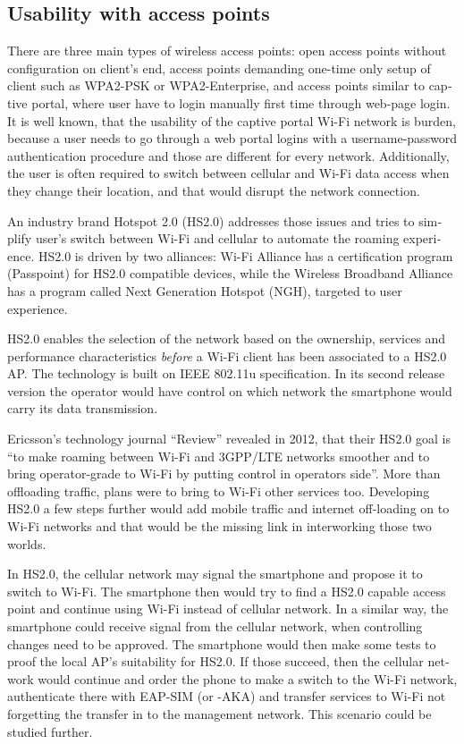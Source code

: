 \documentclass[12pt,a4paper,english]{tutthesis}
\begin{document}
\begin{otherlanguage}{english}
\section{Usability with access points}
\label{sec-6-4}
There are three main types of wireless access points: open access
points without configuration on client's end, access points 
demanding one-time only setup of client such as WPA2-PSK or
WPA2-Enterprise, and access points similar to captive portal, where
user have to login manually first time through web-page login.
It is well known, that the usability of the captive portal Wi-Fi
 network is burden, because a user needs to go through 
a web portal logins with a username-password authentication 
procedure and those are different for every network.
Additionally, the user is often required to switch 
between cellular and  Wi-Fi data access when they change their
 location, and that would disrupt the network connection.

An industry brand  Hotspot 2.0 (HS2.0) addresses those issues and tries to
simplify user's switch between Wi-Fi and cellular to automate the
roaming experience.  HS2.0 is driven by two alliances:
Wi-Fi Alliance has a certification program (Passpoint)
for HS2.0 compatible devices, while the Wireless Broadband
Alliance has a program called Next Generation Hotspot (NGH), targeted
to user experience\cite{wba-ngh}.

HS2.0
enables the selection of the network based on the ownership, services and
performance characteristics \emph{before} a Wi-Fi client has been associated
to a HS2.0 AP. The technology is built on IEEE 802.11u specification. 
In its second release version the operator would
have control on which network the smartphone would carry its data
transmission. 





Ericsson's technology journal ``Review'' revealed in 2012, that their 
HS2.0 goal is ``to make roaming between Wi-Fi and 3GPP/LTE networks smoother
and to bring operator-grade to Wi-Fi by putting control in operators side''. More
than offloading traffic, plans were to bring to Wi-Fi other services too\cite{er-seamless}.
Developing HS2.0 a few steps further would add mobile traffic and internet
off-loading on to Wi-Fi networks and that would be the missing link in
interworking those two worlds.



In HS2.0, the cellular network may signal the smartphone and
propose it to switch to Wi-Fi. The smartphone then would try to find a HS2.0 capable
access point and continue using Wi-Fi instead of cellular network.
In a similar way, the smartphone could receive signal from the cellular
network, when controlling changes need to be approved. The smartphone
would then make some tests to proof the local AP's suitability for 
HS2.0. If those succeed, then the cellular network would continue and order the 
phone to make a switch to the Wi-Fi network, authenticate there with 
EAP-SIM (or -AKA) and transfer services to Wi-Fi not forgetting 
the transfer in to the management network. This scenario could be 
studied further.



\end{otherlanguage}
\end{document}
